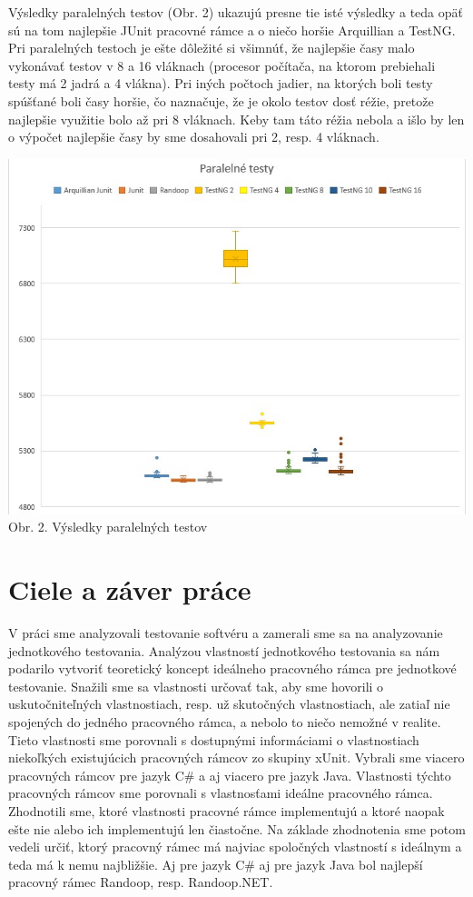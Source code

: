 \documentclass[11pt,twoside,slovak,a4paper]{article}
\begin{document}
	Výsledky paralelných testov (Obr. 2) ukazujú presne tie isté výsledky a teda opäť sú na tom najlepšie JUnit pracovné rámce a o niečo horšie Arquillian a TestNG. Pri paralelných testoch je ešte dôležité si všimnúť, že najlepšie časy malo vykonávať testov v 8 a 16 vláknach (procesor počítača, na ktorom prebiehali testy má 2 jadrá a 4 vlákna). Pri iných počtoch jadier, na ktorých boli testy spúšťané boli časy horšie, čo naznačuje, že je okolo testov dosť réžie, pretože najlepšie využitie bolo až pri 8 vláknach. Keby tam táto réžia nebola a išlo by len o výpočet najlepšie časy by sme dosahovali pri 2, resp. 4 vláknach.
	
	\begin{center}
		\includegraphics[width = 400pt]{paralelne}
		\newline
		\tiny Obr. 2. Výsledky paralelných testov
	\end{center}
	

	\newpage

	\section{Ciele a záver práce}
	
	V práci sme analyzovali testovanie softvéru a zamerali sme sa na analyzovanie jednotkového testovania. Analýzou vlastností jednotkového testovania sa nám podarilo vytvoriť teoretický koncept ideálneho pracovného rámca pre jednotkové testovanie. Snažili sme sa vlastnosti určovať tak, aby sme hovorili o uskutočniteľných vlastnostiach, resp. už skutočných vlastnostiach, ale zatiaľ nie spojených do jedného pracovného rámca, a nebolo to niečo nemožné v realite. Tieto vlastnosti sme porovnali s dostupnými informáciami o vlastnostiach niekoľkých existujúcich pracovných rámcov zo skupiny xUnit. Vybrali sme viacero pracovných rámcov pre jazyk C\# a aj viacero pre jazyk Java. Vlastnosti týchto pracovných rámcov sme porovnali s vlastnosťami ideálne pracovného rámca. Zhodnotili sme, ktoré vlastnosti pracovné rámce implementujú a ktoré naopak ešte nie alebo ich implementujú len čiastočne. Na základe zhodnotenia sme potom vedeli určiť, ktorý pracovný rámec má najviac spoločných vlastností s ideálnym a teda má k nemu najbližšie. Aj pre jazyk C\# aj pre jazyk Java bol najlepší pracovný rámec Randoop, resp. Randoop.NET.
	
\end{document}
